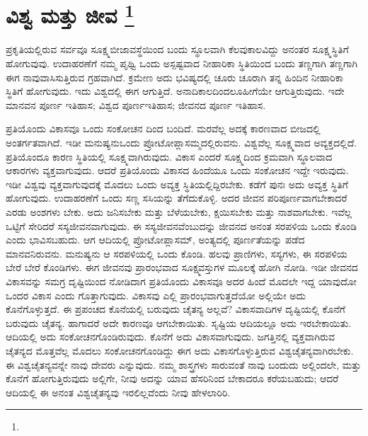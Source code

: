 
\chapter[ವಿಶ್ವ ಮತ್ತು ಜೀವ ]{ವಿಶ್ವ ಮತ್ತು ಜೀವ \protect\footnote{}}

ಪ್ರಕೃತಿಯಲ್ಲಿರುವ ಸರ್ವವೂ ಸೂಕ್ಷ್ಮಬೀಜಾವಸ್ಥೆಯಿಂದ ಬಂದು ಸ್ಥೂಲವಾಗಿ ಕೆಲವು\break ಕಾಲವಿದ್ದು ಅನಂತರ ಸೂಕ್ಷ್ಮಸ್ಥಿತಿಗೆ ಹೋಗುವುವು. ಉದಾಹರಣೆಗೆ ನಮ್ಮ ಪೃಥ್ವಿ ಒಂದು ಅಸ್ಪಷ್ಟವಾದ ನೀಹಾರಿಕಾ ಸ್ಥಿತಿಯಿಂದ ಬಂದು ತಣ್ಣಗಾಗಿ ತಣ್ಣಗಾಗಿ ಈಗ ನಾವು\break ವಾಸಿಸುತ್ತಿರುವ ಗ್ರಹವಾಗಿದೆ. ಕ್ರಮೇಣ ಅದು ಭವಿಷ್ಯದಲ್ಲಿ ಚೂರು ಚೂರಾಗಿ ತನ್ನ ಹಿಂದಿನ ನೀಹಾರಿಕಾ ಸ್ಥಿತಿಗೆ ಹೋಗುವುದು. ಇದು ವಿಶ್ವದಲ್ಲಿ ಈಗ ಆಗುತ್ತಿದೆ. ಅನಾದಿಕಾಲದಿಂದಲೂ\break ಹೀಗೆಯೇ ಆಗುತ್ತಿರುವುದು. ಇದೇ ಮಾನವನ ಪೂರ್ಣ ಇತಿಹಾಸ; ವಿಶ್ವದ ಪೂರ್ಣ\break ಇತಿಹಾಸ; ಜೀವನದ ಪೂರ್ಣ ಇತಿಹಾಸ.

ಪ್ರತಿಯೊಂದು ವಿಕಾಸವೂ ಒಂದು ಸಂಕೋಚನ  ದಿಂದ ಬಂದಿದೆ. ಮರವೆಲ್ಲ ಅದಕ್ಕೆ ಕಾರಣವಾದ ಬೀಜದಲ್ಲಿ ಅಂತರ್ಗತವಾಗಿದೆ. ಇಡೀ ಮನುಷ್ಯನು\break ಒಂದು ಪ್ರೋಟೋಪ್ಲಾಸಮ್ಮದಲ್ಲಿರುವನು. ವಿಶ್ವವೆಲ್ಲ ಸೂಕ್ಷ್ಮವಾದ ಅವ್ಯಕ್ತದಲ್ಲಿದೆ. ಪ್ರತಿಯೊಂದೂ ಕಾರಣ ಸ್ಥಿತಿಯಲ್ಲಿ ಸೂಕ್ಷ್ಮವಾಗಿರುವುದು. ವಿಕಾಸ ಎಂದರೆ ಸೂಕ್ಷ್ಮದಿಂದ ಕ್ರಮವಾಗಿ ಸ್ಥೂಲವಾದ ಆಕಾರಗಳು ವ್ಯಕ್ತವಾಗುವುದು. ಆದರೆ ಪ್ರತಿಯೊಂದು ವಿಕಾಸದ ಹಿಂದೆಯೂ ಒಂದು ಸಂಕೋಚನ ಇದ್ದೇ ಇರುವುದು. ಇಡೀ ವಿಶ್ವವು ವ್ಯಕ್ತವಾಗುವುದಕ್ಕೆ ಮೊದಲು ಒಂದು ಅವ್ಯಕ್ತ ಸ್ಥಿತಿಯಲ್ಲಿದ್ದಿರಬೇಕು. ಕಡೆಗೆ ಪುನಃ ಅದು ಅವ್ಯಕ್ತ ಸ್ಥಿತಿಗೆ ಹೋಗುವುದು. ಉದಾಹರಣೆಗೆ ಒಂದು ಸಣ್ಣ ಸಸಿಯನ್ನು ತೆಗೆದುಕೊಳ್ಳಿ. ಅದರ ಜೀವನ ಪರಿಪೂರ್ಣವಾಗಬೇಕಾದರೆ ಎರಡು ಅಂಶಗಳು ಬೇಕು. ಅದು ಜನಿಸಬೇಕು ಮತ್ತು ಬೆಳೆಯಬೇಕು, ಕ್ಷಯಿಸಬೇಕು ಮತ್ತು ನಾಶವಾಗಬೇಕು. ಇವೆಲ್ಲ ಒಟ್ಟಿಗೆ ಸೇರಿದರೆ ಸಸ್ಯಜೀವನವಾಗುವುದು. ಈ ಸಸ್ಯಜೀವನವೆಂಬುದನ್ನು ಜೀವನದ ಅನಂತ ಸರಪಳಿಯ ಒಂದು ಕೊಂಡಿ ಎಂದು ಭಾವಿಸಬಹುದು. ಆಗ ಆದಿಯಲ್ಲಿ ಪ್ರೋಟೋಪ್ಲಾಸಮ್​, ಅಂತ್ಯದಲ್ಲಿ ಪೂರ್ಣತೆಯನ್ನು ಪಡೆದ ಮಾನವನಿರುವನು. ಮನುಷ್ಯನು ಆ ಸರಪಳಿಯಲ್ಲಿ ಒಂದು ಕೊಂಡಿ. ಹಲವು ಪ್ರಾಣಿಗಳು, ಸಸ್ಯಗಳು, ಈ ಸರಪಳಿಯ ಬೇರೆ ಬೇರೆ ಕೊಂಡಿಗಳು. ಈಗ ಜೀವನವು ಪ್ರಾರಂಭವಾದ ಸೂಕ್ಷ್ಮವಸ್ತುಗಳ ಮೂಲಕ್ಕೆ ಹೋಗಿ ನೋಡಿ. ಇಡೀ ಜೀವನದ ವಿಕಾಸವನ್ನು ಸಮಗ್ರ ದೃಷ್ಟಿಯಿಂದ ನೋಡಿದಾಗ ಪ್ರತಿಯೊಂದು ವಿಕಾಸವೂ ಅದರ ಹಿಂದೆ ಮೊದಲೇ ಇದ್ದ ಯಾವುದೋ ಒಂದರ ವಿಕಾಸ ಎಂದು ಗೊತ್ತಾಗುವುದು. ವಿಕಾಸವು ಎಲ್ಲಿ ಪ್ರಾರಂಭವಾಗುತ್ತದೆಯೋ ಅಲ್ಲಿಯೇ ಅದು ಕೊನೆಗೊಳ್ಳುತ್ತದೆ. ಈ ಪ್ರಪಂಚದ ಕೊನೆಯಲ್ಲಿ ಬರುವುದು ಚೈತನ್ಯ ಅಲ್ಲವೆ? ವಿಕಾಸವಾದಿಗಳ ದೃಷ್ಟಿಯಲ್ಲಿ ಕೊನೆಗೆ ಬರುವುದು ಚೈತನ್ಯ. ಹಾಗಾದರೆ ಅದೇ ಕಾರಣವೂ ಆಗಬೇಕಾಯಿತು. ಸೃಷ್ಟಿಯ ಆದಿಯಲ್ಲೂ ಅದು ಇರಬೇಕಾಯಿತು. ಆದಿಯಲ್ಲಿ ಅದು ಸಂಕೋಚನಗೊಂಡಿರುವುದು. ಕೊನೆಗೆ ಅದು ವಿಕಾಸವಾಗುವುದು. ಜಗತ್ತಿನಲ್ಲಿ ವ್ಯಕ್ತವಾಗಿರುವ ಚೈತನ್ಯದ ಮೊತ್ತವೆಲ್ಲ ಮೊದಲು ಸಂಕೋಚನಗೊಂಡಿದ್ದು ಈಗ ಅದು ವಿಕಾಸಗೊಳ್ಳುತ್ತಿರುವ ವಿಶ್ವಚೈತನ್ಯವಾಗಿರಬೇಕು. ಈ ವಿಶ್ವಚೈತನ್ಯವನ್ನೇ ನಾವು ದೇವರು ಎನ್ನುವುದು. ನಮ್ಮ ಶಾಸ್ತ್ರಗಳು ಸಾರುವಂತೆ ನಾವು ಬಂದುದು ಅಲ್ಲಿಂದಲೇ, ಮತ್ತು ಕೊನೆಗೆ ಹೋಗುತ್ತಿರುವುದು ಅಲ್ಲಿಗೇ, ನೀವು ಅದನ್ನು ಯಾವ ಹೆಸರಿನಿಂದ ಬೇಕಾದರೂ ಕರೆಯಬಹುದು; ಆದರೆ ಆದಿಯಲ್ಲಿ ಈ ಅನಂತ ವಿಶ್ವಚೈತನ್ಯವು ಇರಲಿಲ್ಲವೆಂದು ನೀವು ಹೇಳಲಾರಿರಿ.

